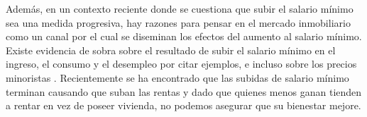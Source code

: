 
Además, en un contexto reciente donde se cuestiona que subir el salario mínimo sea una medida progresiva, hay razones para pensar en el mercado inmobiliario como un canal por el cual se diseminan los efectos del aumento al salario mínimo. Existe evidencia de sobra sobre el resultado de subir el salario mínimo en el ingreso, el consumo y el desempleo por citar ejemplos, e incluso sobre los precios minoristas \citep{leung_2020} . Recientemente se ha encontrado que las subidas de salario mínimo terminan causando que suban las rentas \citep{macurdy_2015,yamagishi_2018,agarwal_ambrose_diop_2019} y dado que quienes menos ganan tienden a rentar en vez de poseer vivienda, no podemos asegurar que su bienestar mejore.
